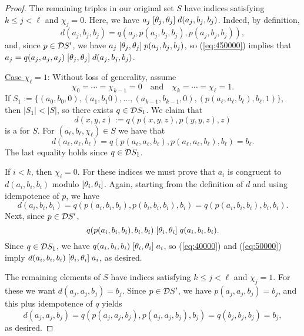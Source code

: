 \documentclass{ws-ijac}
\begin{document}
\begin{proof}
The remaining triples in our original set $S$
have indices satisfying $k\leq j < \ell$ and $\chi_j = 0$.
Here, we have $a_j \mathrel{[\theta_{j}, \theta_{j}]} d(a_j,b_j,b_j)$. Indeed,
by definition,
\begin{equation}
  \label{eq:450000}
d(a_j,b_j,b_j) =q(a_j, p(a_j,b_j,b_j), p(a_j,b_j,b_j)),
\end{equation}
and, since $p \in \mathcal{D} S'$, we have
$a_j \mathrel{[\theta_{j}, \theta_{j}]} p(a_j,b_j,b_j)$,
so (\ref{eq:450000}) implies that
$a_j = q(a_j,a_j,a_j) \mathrel{[\theta_{j}, \theta_{j}]} d(a_j, b_j,b_j)$.


\medskip
\noindent \underline{Case $\chi_\ell = 1$}:
Without loss of generality, assume
\begin{equation*}
  \chi_0 =\cdots =\chi_{k-1} = 0
  \quad \text{and} \quad
\chi_{k} = \cdots = \chi_{\ell} = 1.
\end{equation*}
If
$S_1 := \{(a_0, b_0, 0), (a_1, b_1 0), \dots, (a_{k-1}, b_{k-1}, 0),
        (p(a_\ell, a_\ell, b_\ell), b_\ell, 1)\}$,\\[3pt]
then $|S_1| < |S|$, so there exists $q \in \mathcal{D} S_1$.
We claim  that
\begin{equation*}
  d(x,y,z) := q(p(x,y,z), p(y,y,z), z)
\end{equation*}
is a \ldto for $S$. For $(a_\ell,b_\ell,\chi_\ell) \in S$ we have that
\[
d(a_\ell,a_\ell,b_\ell) = q(p(a_\ell,a_\ell,b_\ell), p(a_\ell,a_\ell,b_\ell), b_\ell) =b_\ell.
\]
The last equality holds since $q \in \mathcal{D} S_1$.

If $i < k$, then $\chi_i =0$. For these indices we must prove
that $a_i$ is congruent to $d(a_i,b_i,b_i)$ modulo $[\theta_{i}, \theta_{i}]$.
Again, starting from the definition of $d$ and using idempotence of $p$, we have
\begin{equation}
  \label{eq:40000}
  d(a_i,b_i,b_i) =
  q(p(a_i,b_i,b_i), p(b_i,b_i,b_i), b_i)=
  q(p(a_i,b_i,b_i), b_i, b_i).
\end{equation}
Next, since $p \in \mathcal{D} S'$,
\begin{equation}
  \label{eq:50000}
  q(p(a_i,b_i,b_i), b_i, b_i)
 \comr{\thetai}
 q(a_i, b_i, b_i).
\end{equation}
Since $q \in \mathcal{D} S_1$, we have
$q(a_i, b_i, b_i) \mathrel{[\theta_{i}, \theta_{i}]} a_i$, so
(\ref{eq:40000}) and (\ref{eq:50000}) imply
$d(a_i,b_i,b_i) \mathrel{[\theta_{i}, \theta_{i}]} a_i$, as desired.

The remaining elements of $S$
have indices satisfying $k\leq j < \ell$ and $\chi_j = 1$.
For these we want $d(a_j,a_j,b_j) = b_j$.
Since $p \in \mathcal{D} S'$, we have
$p(a_j,a_j,b_j) = b_j$, and this plus idempotence of $q$ yields
\begin{equation*}
 d(a_j,a_j,b_j) =  q(p(a_j,a_j,b_j), p(a_j,a_j,b_j), b_j)=  q(b_j, b_j, b_j) =b_j,
\end{equation*}
as desired.
\end{proof}
\end{document}
